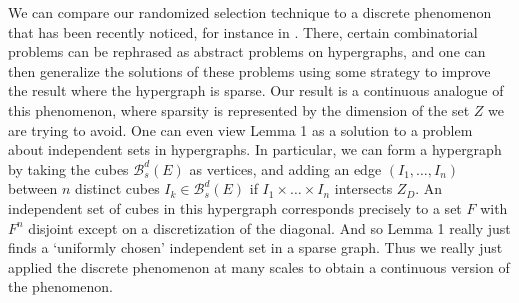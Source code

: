 \documentclass[dvipsnames]{article}
\theoremstyle{plain}
\theoremstyle{plain}
\begin{document}
We can compare our randomized selection technique to a discrete phenomenon that has been recently noticed, for instance in \cite{BaloghMorrisSamotij}. There, certain combinatorial problems can be rephrased as abstract problems on hypergraphs, and one can then generalize the solutions of these problems using some strategy to improve the result where the hypergraph is sparse. Our result is a continuous analogue of this phenomenon, where sparsity is represented by the dimension of the set $Z$ we are trying to avoid. One can even view Lemma 1 as a solution to a problem about independent sets in hypergraphs. In particular, we can form a hypergraph by taking the cubes $\mathcal{B}^d_s(E)$ as vertices, and adding an edge $(I_1, \dots, I_n)$ between $n$ distinct cubes $I_k \in \mathcal{B}^d_s(E)$ if $I_1 \times \dots \times I_n$ intersects $Z_D$. An independent set of cubes in this hypergraph corresponds precisely to a set $F$ with $F^n$ disjoint except on a discretization of the diagonal. And so Lemma 1 really just finds a `uniformly chosen' independent set in a sparse graph. Thus we really just applied the discrete phenomenon at many scales to obtain a continuous version of the phenomenon.



\end{document}
